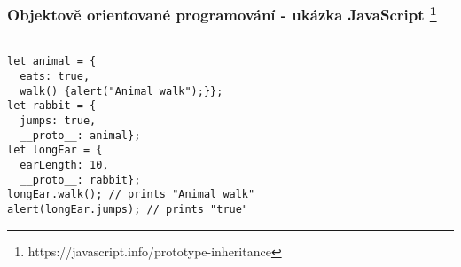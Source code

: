 \begin{frame}[fragile]
    \frametitle{Objektově orientované programování - ukázka JavaScript \footnote{https://javascript.info/prototype-inheritance}   }
\begin{lstlisting}[]

let animal = {
  eats: true,
  walk() {alert("Animal walk");}};
let rabbit = {
  jumps: true,
  __proto__: animal};
let longEar = {
  earLength: 10,
  __proto__: rabbit};
longEar.walk(); // prints "Animal walk"
alert(longEar.jumps); // prints "true"

\end{lstlisting}
    
\end{frame}